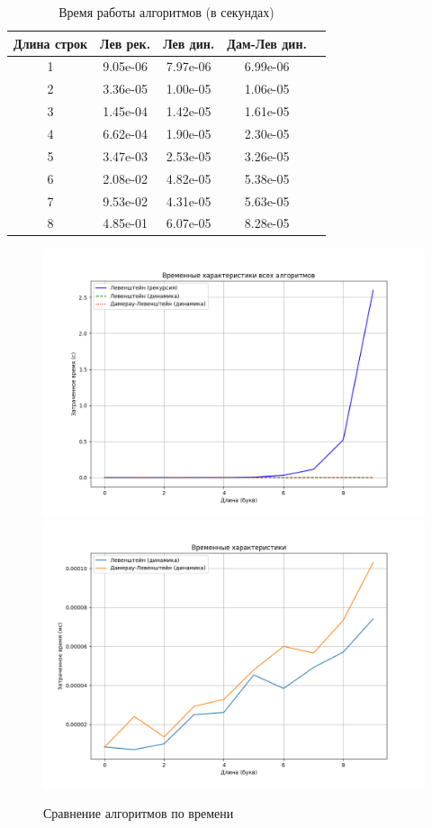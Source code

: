 \begin{table}[h]
	\begin{center}
		\begin{threeparttable}
		\captionsetup{justification=raggedright,singlelinecheck=off}
		\caption{Время работы алгоритмов (в секундах)}
		\label{tbl:time_measurements}
		\begin{tabular}{|c|c|c|c|c|}
			\hline
			Длина строк &  Лев рек. & Лев дин. & Дам-Лев дин. \\
			\hline
			1    & 9.05e-06 & 7.97e-06 & 6.99e-06 \\ 
			\hline
			2    & 3.36e-05 & 1.00e-05 & 1.06e-05 \\ 
			\hline
			3    & 1.45e-04 & 1.42e-05 & 1.61e-05 \\ 
			\hline
			4    & 6.62e-04 & 1.90e-05 & 2.30e-05 \\ 
			\hline
			5    & 3.47e-03 & 2.53e-05 & 3.26e-05 \\ 
			\hline
			6    & 2.08e-02 & 4.82e-05 & 5.38e-05 \\ 
			\hline
			7    & 9.53e-02 & 4.31e-05 & 5.63e-05 \\ 
			\hline
			8    & 4.85e-01 & 6.07e-05 & 8.28e-05 \\ 
			\hline
		\end{tabular}
		\end{threeparttable}
    \end{center}
\end{table}

\begin{figure}[H]
    \centering
    \includegraphics[width=0.8\linewidth]{img/Figure_3.png}
    \vspace{5mm}
    \includegraphics[width=0.8\linewidth]{img/Figure_2.png}
    \caption{Сравнение алгоритмов по времени}
    \label{fig:time_measurements}
\end{figure}


